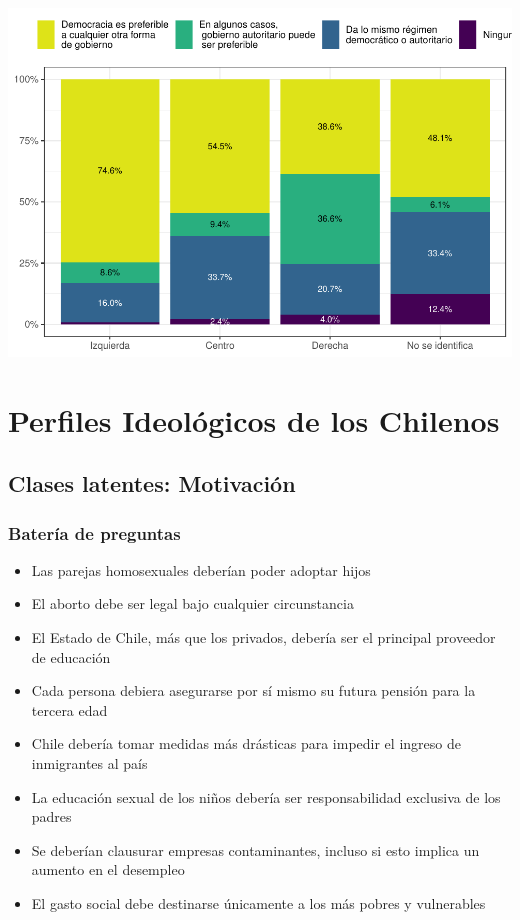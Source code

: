 \documentclass[
  12pt,
]{book}
\providecommand{\tightlist}{%
  \setlength{\itemsep}{0pt}\setlength{\parskip}{0pt}}
\begin{document}
\includegraphics{reporte-elsoc_files/figure-latex/unnamed-chunk-25-1.pdf}

\hypertarget{perfiles-ideoluxf3gicos-de-los-chilenos}{%
\chapter{Perfiles Ideológicos de los Chilenos}\label{perfiles-ideoluxf3gicos-de-los-chilenos}}

\hypertarget{clases-latentes-motivaciuxf3n}{%
\section{Clases latentes: Motivación}\label{clases-latentes-motivaciuxf3n}}

\hypertarget{bateruxeda-de-preguntas}{%
\subsection{Batería de preguntas}\label{bateruxeda-de-preguntas}}

\begin{itemize}
\tightlist
\item
  Las parejas homosexuales deberían poder adoptar hijos
\item
  El aborto debe ser legal bajo cualquier circunstancia
\item
  El Estado de Chile, más que los privados, debería ser el principal proveedor de educación
\item
  Cada persona debiera asegurarse por sí mismo su futura pensión para la tercera edad
\item
  Chile debería tomar medidas más drásticas para impedir el ingreso de inmigrantes al país
\item
  La educación sexual de los niños debería ser responsabilidad exclusiva de los padres
\item
  Se deberían clausurar empresas contaminantes, incluso si esto implica un aumento en el desempleo
\item
  El gasto social debe destinarse únicamente a los más pobres y vulnerables
\end{itemize}
\end{document}
